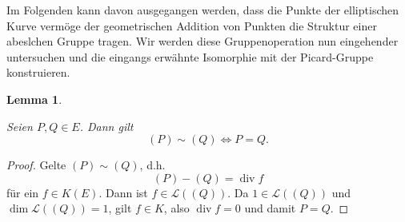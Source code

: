 \documentclass{amsart}
\theoremstyle{plain}
\newtheorem{lemma}[subsection]{Lemma}
\theoremstyle{definition}
\newcommand{\divop}{\operatorname{div}}
\newcommand{\riemannspace}{\mathcal{L}}
\begin{document}
Im Folgenden kann davon ausgegangen werden, dass die Punkte der elliptischen Kurve vermöge der geometrischen Addition von Punkten die Struktur einer abeslchen Gruppe tragen.
Wir werden diese Gruppenoperation nun eingehender untersuchen und die eingangs erwähnte Isomorphie mit der Picard-Gruppe konstruieren.

\begin{lemma}
	\label{lem-divisor-aequivalenz}

	Seien $P, Q \in E$. Dann gilt
	\begin{equation*}
		(P) \sim (Q) \Leftrightarrow P = Q.
	\end{equation*}
\end{lemma}
\begin{proof}
	Gelte $(P) \sim (Q)$, d.h.
	\begin{equation*}
		(P) - (Q) = \divop f
	\end{equation*}
	für ein $f \in K(E)$. Dann ist $f \in \riemannspace((Q))$.
	Da $1 \in \riemannspace((Q))$ und $\dim \riemannspace((Q)) = 1$, gilt $f \in K$, also $\divop f = 0$ und damit $P = Q$.
\end{proof}
\end{document}
